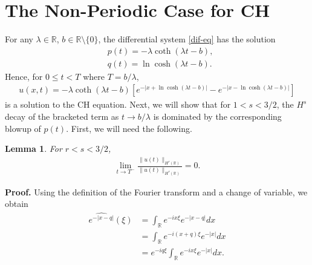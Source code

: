 \documentclass[12pt,reqno]{amsart}
\numberwithin{equation}{section}  %
\numberwithin{figure}{section}
\newcommand{\rr}{\mathbb{R}}
\theoremstyle{plain}  %
\newtheorem{lemma}{Lemma}
\theoremstyle{definition}
\begin{document}
\section{The Non-Periodic Case for CH}
For any $\lambda \in \rr$, $b \in \rr \setminus \{0\}$, the differential system \eqref{dif-eq} has the
solution
%
%
\begin{equation}
  \label{dif-eq-soln}
  \begin{split}
    & p(t) = - \lambda \coth (\lambda t - b),
    \\
    & q(t) = \ln \cosh (\lambda t - b).
  \end{split}
\end{equation}
%
%
Hence, for $0 \le t < T$ where $T = b / \lambda$,
%
%
\begin{equation}
  \label{soln-CH}
  \begin{split}
    u(x,t)=-\lambda \coth(\lambda t -b)\left[ e^{-| x+ \ln \cosh(\lambda t -b)|} 
    - e^{-| x - \ln \cosh(\lambda t -b) |} \right]
  \end{split}
\end{equation}
%
%
is a solution to the CH equation. Next, we will show that for $1 <
s < 3/2 $, the $H^s$ decay of the bracketed term as $t \to b / \lambda$ is
dominated by the corresponding blowup of $p(t)$. First, we will need the
following. 
%
%
%
%
%
%
%
%
%
%
%
\begin{lemma}
  \label{lem:norm-blowup}
  For $r < s < 3/2$,
  \begin{equation}
    \label{norm-blowup}
    \begin{split}
      \lim_{t \to T^{-}}
      \frac{\|u(t)\|_{H^{r}(\rr)}}{\|u(t)\|_{H^{s}(\rr)}} = 0.
    \end{split}
  \end{equation}
\end{lemma}
%
%
{\bf Proof.} Using the definition of the Fourier transform and a change of
variable, we obtain
%
%
\begin{equation}
  \label{1h}
  \begin{split}
    \widehat{e^{-| x-q |}}(\xi)
    & = \int_{\rr} e^{-ix \xi} e^{-| x-q |}dx
    \\
    & = \int_{\rr} e^{-i(x+q)\xi} e^{-| x |} dx
    \\
    & = e^{-iq \xi} \int_{\rr} e^{-ix \xi} e^{-| x |}dx.
  \end{split}
\end{equation}
\end{document}
